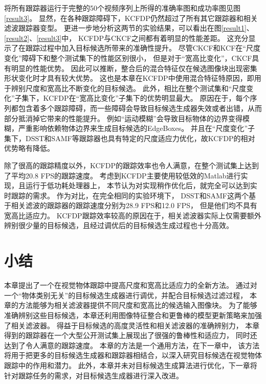 将所有跟踪器运行于完整的50个视频序列上所得的准确率图和成功率图见图\ref{result3}。
显然，在各种跟踪障碍下，KCFDP仍然超过了所有其它跟踪器和相关滤波跟踪器变型。
更进一步地分析这两节的实验结果，可以看出在图\ref{result1}、\ref{result2}、\ref{result3}中，
KCFDP与CKCF之间都有着明显的性能差距。
这充分显示了在跟踪过程中加入目标候选所带来的准确性提升。
尽管CKCF和KCF在``尺度变化''障碍下和整个测试集下的性能区别很小，
但是对于``宽高比变化''，CKCF具有明显的性能优势。
因此可以推断，整合后的混合特征仅在候选图像块出现密集形状变化时才具有较大优势。
这也是本章在KCFDP中使用混合特征特原因，即用于辨别尺度和宽高比不断变化的目标候选。
此外，相比在整个测试集和``尺度变化''子集下，KCFDP在``宽高比变化''子集下的优势明显最大。
原因在于，每个序列都包含着多个跟踪障碍，而一些障碍会导致目标候选生成器失效或者出错，从而部分抵消掉它带来的性能提升。
例如``运动模糊''会导致目标物体的边界变得模糊，严重影响依赖物体边界来生成目标候选的EdgeBoxes。
并且在``尺度变化''子集下，DSST和SAMF等跟踪器也具有特定的尺度适应力优化，故KCFDP的相对优势略有降低。


除了很高的跟踪精度以外，KCFDP的跟踪效率也令人满意，在整个测试集上达到了平均20.8 FPS的跟踪速度。
考虑到KCFDP主要使用较低效的Matlab进行实现，且运行于低功耗处理器上，
本节认为对实现稍作优化后，就完全可以达到实时跟踪的需求。
作为对比，在完全相同的实验环境下，
DSST和SAMF这两个基于相关滤波的跟踪器的跟踪速度分别为28.9 FPS和12.0 FPS，
但是他们均不具有宽高比适应力。
KCFDP跟踪效率较高的原因在于，相关滤波器实际上仅需要额外辨别很少量的目标候选，且经过调优后的目标候选生成过程也十分高效。

\section{小结}
本章提出了一个在视觉物体跟踪中提高尺度和宽高比适应力的全新方法。
通过对一个``物体类别无关''的目标候选生成器进行调优，并配合目标候选过滤过程，
本章的方法能够为相关滤波器提供不同尺度和宽高比的候选输入图像块。
为了能够准确辨别这些目标候选，本章还利用图像特征整合和更鲁棒的模型更新策略来加强了相关滤波器。
得益于目标候选的高度灵活性和相关滤波器的准确辨别力，
本章得到的跟踪器在一个大型公开测试集上展现出了很强的鲁棒性和适应力，
同时还达到了令人满意的跟踪速度。
本章的方法是一个通用方法，在下一章中，
该方法将用于把更多的目标候选生成器和跟踪器相结合，以深入研究目标候选在视觉物体跟踪中的作用和潜力。
此外，本章并未对目标候选生成算法进行优化，下一章将针对跟踪任务的需求，对目标候选生成器进行深入改进。
